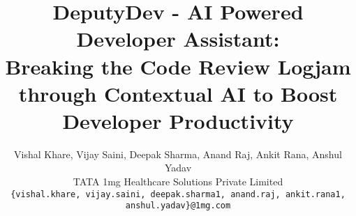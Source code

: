 \documentclass[twocolumn]{article}
\title{\textbf{DeputyDev - AI Powered Developer Assistant:\\
Breaking the Code Review Logjam through Contextual AI to Boost Developer Productivity}}
\author{Vishal Khare, Vijay Saini, Deepak Sharma, Anand Raj, Ankit Rana, Anshul Yadav\\
TATA 1mg Healthcare Solutions Private Limited\\
{\tt\small \{vishal.khare, vijay.saini, deepak.sharma1, anand.raj, ankit.rana1, anshul.yadav\}@1mg.com}
}
\date{}
\begin{document}
\maketitle


























{\small


}

\clearpage


\end{document}

